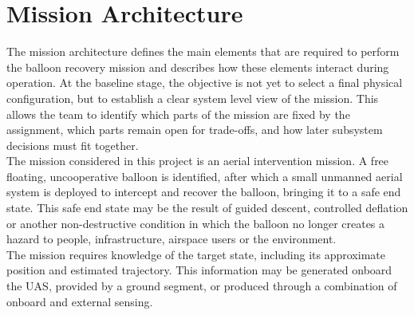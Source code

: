 \chapter{Mission Architecture}
\label{ch:mission_architecture}









The mission architecture defines the main elements that are required to perform the balloon recovery mission and describes how these elements interact during operation. At the baseline stage, the objective is not yet to select a final physical configuration, but to establish a clear system level view of the mission. This allows the team to identify which parts of the mission are fixed by the assignment, which parts remain open for trade-offs, and how later subsystem decisions must fit together.\\

The mission considered in this project is an aerial intervention mission. A free floating, uncooperative balloon is identified, after which a small unmanned aerial system is deployed to intercept and recover the balloon, bringing it to a safe end state. This safe end state may be the result of guided descent, controlled deflation or another non-destructive condition in which the balloon no longer creates a hazard to people, infrastructure, airspace users or the environment.\\

The mission requires knowledge of the target state, including its approximate position and estimated trajectory. This information may be generated onboard the UAS, provided by a ground segment, or produced through a combination of onboard and external sensing.   \\

